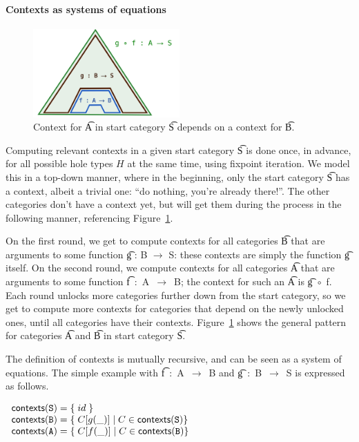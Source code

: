 \paragraph{Contexts as systems of equations}

\begin{figure}[h]
\centering
\includegraphics[width=0.5\textwidth]{img/contexts-dependence.png}
\caption{Context for \t{A} in start
  category \t{S} depends on a context for \t{B}.}
\label{fig:context-dependence}
\end{figure}

Computing relevant contexts in a given start category \t{S} is done
once, in advance, for all possible hole types $H$ at the same time,
using fixpoint iteration. 
We model this in a top-down manner, where in the beginning, only the
start category \t{S} has a context, albeit a trivial one: ``do
nothing, you're already there!''. The other categories don't have a
context yet, but will get them during the process in the following
manner, referencing Figure~\ref{fig:context-dependence}. 

On the first round, we get to compute contexts for all categories
\t{B} that are arguments to some function \t{g : B $\rightarrow$ S}:
these contexts are simply the function \t{g} itself. On the second
round, we compute contexts for all categories \t{A} that are arguments
to some function \t{f~:~A~$\rightarrow$~B}; the context for such an
\t{A} is \t{g~$\circ$~f}. Each round unlocks more categories further
down from the start category, so we get to compute more contexts for
categories that depend on the newly unlocked ones, until all
categories have their contexts. Figure~\ref{fig:context-dependence}
shows the general pattern for categories \t{A} and \t{B} in start
category \t{S}.

The definition of contexts is mutually recursive, and can be seen as a
system of equations. The simple example with \t{f~:~A~$\rightarrow$~B}
and \t{g~:~B~$\rightarrow$~S} is expressed as follows.


\begin{EmptyItem}
$\begin{array}{l @{\hspace{0.1cm}} l}
\textsf{contexts}(\t{S}) = & \{ \; id \; \} \\
\textsf{contexts}(\t{B}) = &  \{ \; C[g(\_)] \; | \; C \in
                             \textsf{contexts}(\t{S}) \} \\
\textsf{contexts}(\t{A}) = &  \{ \; C[f(\_)] \; | \; C \in
                             \textsf{contexts}(\t{B}) \} \\

\end{array}$
\end{EmptyItem}


